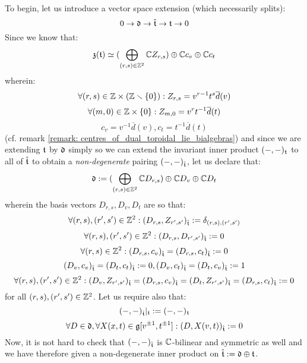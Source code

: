 \begin{remark}
                To begin, let us introduce a vector space extension (which necessarily splits):
                    $$0 \to \mathfrak{d} \to \hat{\mathfrak{t}} \to \mathfrak{t} \to 0$$
                Since we know that:
                    $$\mathfrak{z}(\mathfrak{t}) \simeq ( \bigoplus_{(r, s) \in \mathbb{Z}^2} \mathbb{C} Z_{r, s}) \oplus \mathbb{C} c_v \oplus \mathbb{C} c_t$$
                wherein:
                    $$\forall (r, s) \in \Z \x (\Z \setminus \{0\}): Z_{r, s} = v^{r - 1} t^s \overline{d}(v)$$
                    $$\forall (m, 0) \in \Z \x \{0\}: Z_{m, 0} = v^r t^{-1} \overline{d}(t)$$
                    $$c_v = v^{-1} \overline{d}(v), c_t = t^{-1} \overline{d}(t)$$
                (cf. remark \ref{remark: centres_of_dual_toroidal_lie_bialgebras}) and since we are extending $\mathfrak{t}$ by $\mathfrak{d}$ simply so we can extend the invariant inner product $(-, -)_{\mathfrak{t}}$ to all of $\hat{\mathfrak{t}}$ to obtain a \textit{non-degenerate} pairing $(-, -)_{\hat{\mathfrak{t}}}$, let us declare that:
                    $$\mathfrak{d} := (\bigoplus_{(r, s) \in \mathbb{Z}^2} \mathbb{C} D_{r, s}) \oplus \mathbb{C} D_v \oplus \mathbb{C} D_t$$
                wherein the basis vectors $D_{r, s}, D_v, D_t$ are so that:
                    $$\forall (r, s), (r', s') \in \mathbb{Z}^2: (D_{r, s}, Z_{r', s'})_{\hat{\mathfrak{t}}} := \delta_{(r, s), (r', s')}$$
                    $$\forall (r, s), (r', s') \in \mathbb{Z}^2: (D_{r, s}, D_{r', s'})_{\hat{\mathfrak{t}}} := 0$$
                    $$\forall (r, s) \in \mathbb{Z}^2: (D_{r, s}, c_v)_{\hat{\mathfrak{t}}} = (D_{r, s}, c_t)_{\hat{\mathfrak{t}}} := 0$$ 
                    $$(D_v, c_v)_{\hat{\mathfrak{t}}} = (D_t, c_t)_{\hat{\mathfrak{t}}} := 0, (D_v, c_t)_{\hat{\mathfrak{t}}} = (D_t, c_v)_{\hat{\mathfrak{t}}} := 1$$
                    $$\forall (r, s), (r', s') \in \mathbb{Z}^2: (D_v, Z_{r', s'})_{\hat{\mathfrak{t}}} = (D_{r, s}, c_v)_{\hat{\mathfrak{t}}} = (D_t, Z_{r', s'})_{\hat{\mathfrak{t}}} = (D_{r, s}, c_t)_{\hat{\mathfrak{t}}} := 0$$
                for all $(r, s), (r', s') \in \mathbb{Z}^2$. Let us require also that:
                    $$(-, -)_{\hat{\mathfrak{t}}}|_{\mathfrak{t}} := (-, -)_{\mathfrak{t}}$$
                    $$\forall D \in \mathfrak{d}, \forall X(x, t) \in \mathfrak{g}[v^{\pm 1}, t^{\pm 1}]: (D, X(v, t))_{\hat{\mathfrak{t}}} := 0$$
                Now, it is not hard to check that $(-, -)_{\hat{\mathfrak{t}}}$ is $\mathbb{C}$-bilinear and symmetric as well and we have therefore given a non-degenerate inner product on $\hat{\mathfrak{t}} := \mathfrak{d} \oplus \mathfrak{t}$. 
            \end{remark}
